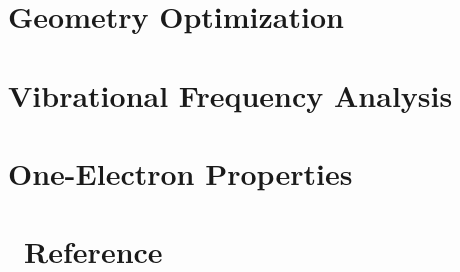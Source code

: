 \documentclass[12pt]{article}
\begin{document}
\section{Geometry Optimization}
\section{Vibrational Frequency Analysis}
\section{One-Electron Properties}

\newpage
\appendix
\section{\PSIthree\ Reference}\label{PSI_Reference}
%

%



\end{document}

